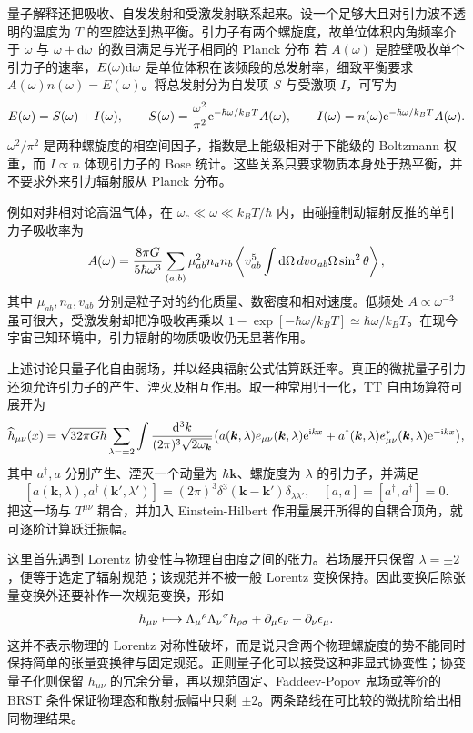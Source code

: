量子解释还把吸收、自发发射和受激发射联系起来。设一个足够大且对引力波不透明的温度为 $T$ 的空腔达到热平衡。引力子有两个螺旋度，故单位体积内角频率介于 $\omega$ 与 $\omega+\dd\omega$ 的数目满足与光子相同的 Planck 分布
若 $A(\omega)$ 是腔壁吸收单个引力子的速率，$E(\omega)\dd\omega$ 是单位体积在该频段的总发射率，细致平衡要求 $A(\omega)n(\omega)=E(\omega)$。将总发射分为自发项 $S$ 与受激项 $I$，可写为
\[
    E(\omega)=S(\omega)+I(\omega),\qquad
    S(\omega)=\frac{\omega^2}{\pi^2}\mathrm{e}^{-\hbar\omega/k_BT}A(\omega),\qquad
    I(\omega)=n(\omega)\mathrm{e}^{-\hbar\omega/k_BT}A(\omega).
\]
$\omega^2/\pi^2$ 是两种螺旋度的相空间因子，指数是上能级相对于下能级的 Boltzmann 权重，而 $I\propto n$ 体现引力子的 Bose 统计。这些关系只要求物质本身处于热平衡，并不要求外来引力辐射服从 Planck 分布。

例如对非相对论高温气体，在 $\omega_c\ll\omega\ll k_BT/\hbar$ 内，由碰撞制动辐射反推的单引力子吸收率为
\[
    A(\omega)=\frac{8\pi G}{5\hbar\omega^3}
    \sum_{(a,b)}\mu_{ab}^2n_an_b
    \left\langle v_{ab}^5\int\dd\Omega\,dv{\sigma_{ab}}{\Omega}\sin^2\theta\right\rangle,
\]
其中 $\mu_{ab},n_a,v_{ab}$ 分别是粒子对的约化质量、数密度和相对速度。低频处 $A\propto\omega^{-3}$ 虽可很大，受激发射却把净吸收再乘以 $1-\exp[-\hbar\omega/k_BT]\simeq\hbar\omega/k_BT$。在现今宇宙已知环境中，引力辐射的物质吸收仍无显著作用。

上述讨论只量子化自由弱场，并以经典辐射公式估算跃迁率。真正的微扰量子引力还须允许引力子的产生、湮灭及相互作用。取一种常用归一化，TT 自由场算符可展开为
\[
    \widehat h_{\mu\nu}(x)=\sqrt{32\pi G\hbar}
    \sum_{\lambda=\pm2}\int\frac{\dd[3]{k}}{(2\pi)^3\sqrt{2\omega_{\bm k}}}
    \big(a(\bm k,\lambda)e_{\mu\nu}(\bm k,\lambda)\mathrm{e}^{\mathrm{i} kx}+a^\dagger(\bm k,\lambda)e_{\mu\nu}^*(\bm k,\lambda)\mathrm{e}^{-\mathrm{i} kx}\big),
\]
其中 $a^\dagger,a$ 分别产生、湮灭一个动量为 $\hbar\bm k$、螺旋度为 $\lambda$ 的引力子，并满足
\[
    [a(\bm k,\lambda),a^\dagger(\bm k',\lambda')]
       =(2\pi)^3\delta^3(\bm k-\bm k')\delta_{\lambda\lambda'},\quad
    [a,a]=[a^\dagger,a^\dagger]=0.
\]
把这一场与 $T^{\mu\nu}$ 耦合，并加入 Einstein-Hilbert 作用量展开所得的自耦合顶角，就可逐阶计算跃迁振幅。

这里首先遇到 Lorentz 协变性与物理自由度之间的张力。若场展开只保留 $\lambda=\pm2$，便等于选定了辐射规范；该规范并不被一般 Lorentz 变换保持。因此变换后除张量变换外还要补作一次规范变换，形如
\[
    h_{\mu\nu}\longmapsto
    \Lambda_\mu{}^\rho\Lambda_\nu{}^\sigma h_{\rho\sigma}
    +\partial_\mu\epsilon_\nu+\partial_\nu\epsilon_\mu.
\]
这并不表示物理的 Lorentz 对称性破坏，而是说只含两个物理螺旋度的势不能同时保持简单的张量变换律与固定规范。正则量子化可以接受这种非显式协变性；协变量子化则保留 $h_{\mu\nu}$ 的冗余分量，再以规范固定、Faddeev-Popov 鬼场或等价的 BRST 条件保证物理态和散射振幅中只剩 $\pm2$。两条路线在可比较的微扰阶给出相同物理结果。

